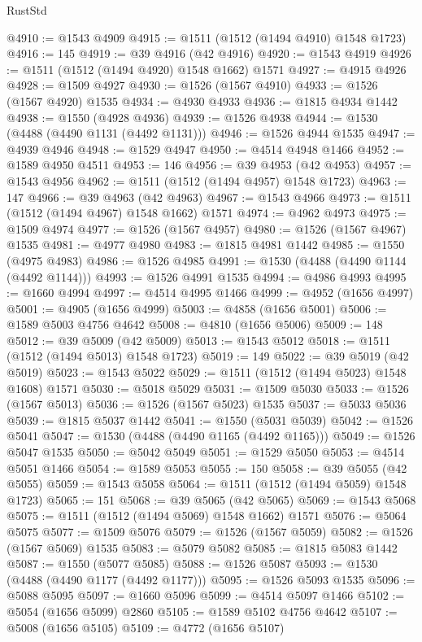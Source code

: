 \begin{lexlean}{RustStd}
\begin{coremodule}
{{@4910 := @1543 @4909
@4915 := @1511 (@1512 (@1494 @4910) @1548 @1723)
@4916 := 145
@4919 := @39 @4916 (@42 @4916)
@4920 := @1543 @4919
@4926 := @1511 (@1512 (@1494 @4920) @1548 @1662) @1571
@4927 := @4915 @4926
@4928 := @1509 @4927
@4930 := @1526 (@1567 @4910)
@4933 := @1526 (@1567 @4920) @1535
@4934 := @4930 @4933
@4936 := @1815 @4934 @1442
@4938 := @1550 (@4928 @4936)
@4939 := @1526 @4938
@4944 := @1530 (@4488 (@4490 @1131 (@4492 @1131)))
@4946 := @1526 @4944 @1535
@4947 := @4939 @4946
@4948 := @1529 @4947
@4950 := @4514 @4948 @1466
@4952 := @1589 @4950 @4511
@4953 := 146
@4956 := @39 @4953 (@42 @4953)
@4957 := @1543 @4956
@4962 := @1511 (@1512 (@1494 @4957) @1548 @1723)
@4963 := 147
@4966 := @39 @4963 (@42 @4963)
@4967 := @1543 @4966
@4973 := @1511 (@1512 (@1494 @4967) @1548 @1662) @1571
@4974 := @4962 @4973
@4975 := @1509 @4974
@4977 := @1526 (@1567 @4957)
@4980 := @1526 (@1567 @4967) @1535
@4981 := @4977 @4980
@4983 := @1815 @4981 @1442
@4985 := @1550 (@4975 @4983)
@4986 := @1526 @4985
@4991 := @1530 (@4488 (@4490 @1144 (@4492 @1144)))
@4993 := @1526 @4991 @1535
@4994 := @4986 @4993
@4995 := @1660 @4994
@4997 := @4514 @4995 @1466
@4999 := @4952 (@1656 @4997)
@5001 := @4905 (@1656 @4999)
@5003 := @4858 (@1656 @5001)
@5006 := @1589 @5003 @4756 @4642
@5008 := @4810 (@1656 @5006)
@5009 := 148
@5012 := @39 @5009 (@42 @5009)
@5013 := @1543 @5012
@5018 := @1511 (@1512 (@1494 @5013) @1548 @1723)
@5019 := 149
@5022 := @39 @5019 (@42 @5019)
@5023 := @1543 @5022
@5029 := @1511 (@1512 (@1494 @5023) @1548 @1608) @1571
@5030 := @5018 @5029
@5031 := @1509 @5030
@5033 := @1526 (@1567 @5013)
@5036 := @1526 (@1567 @5023) @1535
@5037 := @5033 @5036
@5039 := @1815 @5037 @1442
@5041 := @1550 (@5031 @5039)
@5042 := @1526 @5041
@5047 := @1530 (@4488 (@4490 @1165 (@4492 @1165)))
@5049 := @1526 @5047 @1535
@5050 := @5042 @5049
@5051 := @1529 @5050
@5053 := @4514 @5051 @1466
@5054 := @1589 @5053
@5055 := 150
@5058 := @39 @5055 (@42 @5055)
@5059 := @1543 @5058
@5064 := @1511 (@1512 (@1494 @5059) @1548 @1723)
@5065 := 151
@5068 := @39 @5065 (@42 @5065)
@5069 := @1543 @5068
@5075 := @1511 (@1512 (@1494 @5069) @1548 @1662) @1571
@5076 := @5064 @5075
@5077 := @1509 @5076
@5079 := @1526 (@1567 @5059)
@5082 := @1526 (@1567 @5069) @1535
@5083 := @5079 @5082
@5085 := @1815 @5083 @1442
@5087 := @1550 (@5077 @5085)
@5088 := @1526 @5087
@5093 := @1530 (@4488 (@4490 @1177 (@4492 @1177)))
@5095 := @1526 @5093 @1535
@5096 := @5088 @5095
@5097 := @1660 @5096
@5099 := @4514 @5097 @1466
@5102 := @5054 (@1656 @5099) @2860
@5105 := @1589 @5102 @4756 @4642
@5107 := @5008 (@1656 @5105)
@5109 := @4772 (@1656 @5107)
}}
\end{coremodule}
\end{lexlean}
